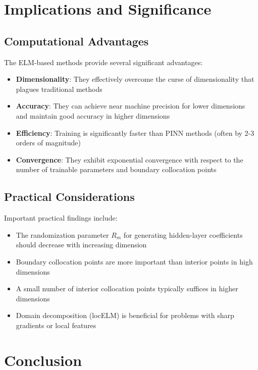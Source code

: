 \documentclass[11pt]{article}
\begin{document}
\section{Implications and Significance}

\subsection{Computational Advantages}

The ELM-based methods provide several significant advantages:
\begin{itemize}
    \item \textbf{Dimensionality}: They effectively overcome the curse of dimensionality that plagues traditional methods
    \item \textbf{Accuracy}: They can achieve near machine precision for lower dimensions and maintain good accuracy in higher dimensions
    \item \textbf{Efficiency}: Training is significantly faster than PINN methods (often by 2-3 orders of magnitude)
    \item \textbf{Convergence}: They exhibit exponential convergence with respect to the number of trainable parameters and boundary collocation points
\end{itemize}

\subsection{Practical Considerations}

Important practical findings include:
\begin{itemize}
    \item The randomization parameter $R_m$ for generating hidden-layer coefficients should decrease with increasing dimension
    \item Boundary collocation points are more important than interior points in high dimensions
    \item A small number of interior collocation points typically suffices in higher dimensions
    \item Domain decomposition (locELM) is beneficial for problems with sharp gradients or local features
\end{itemize}

\section{Conclusion}
\end{document}
